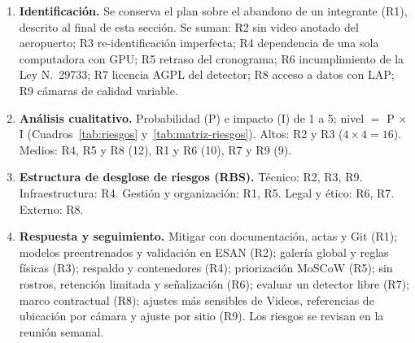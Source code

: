 \documentclass[12pt,a4paper]{article}
\begin{document}
\begin{enumerate}
    \item \textbf{Identificación.} Se conserva el plan sobre el abandono de un
    integrante (R1), descrito al final de esta sección. Se suman: R2 sin video
    anotado del aeropuerto; R3 re-identificación imperfecta; R4 dependencia de
    una sola computadora con GPU; R5 retraso del cronograma; R6
    incumplimiento de la Ley N.\textdegree~29733; R7 licencia AGPL del
    detector; R8 acceso a datos con LAP; R9 cámaras de calidad variable.

    \item \textbf{Análisis cualitativo.} Probabilidad (P) e impacto (I) de 1 a
    5; nivel $=$ P $\times$ I (Cuadros~\ref{tab:riesgos} y~\ref{tab:matriz-riesgos}).
    Altos: R2 y R3 ($4 \times 4 = 16$). Medios: R4, R5 y R8 (12), R1 y R6
    (10), R7 y R9 (9).

    \item \textbf{Estructura de desglose de riesgos (RBS).} Técnico: R2, R3, R9.
    Infraestructura: R4. Gestión y organización: R1, R5. Legal y ético: R6, R7. Externo: R8.

    \item \textbf{Respuesta y seguimiento.} Mitigar con documentación, actas y
    Git (R1); modelos preentrenados y validación en ESAN (R2); galería global
    y reglas físicas (R3); respaldo y contenedores (R4); priorización MoSCoW
    (R5); sin rostros, retención limitada y señalización (R6); evaluar un
    detector libre (R7); marco contractual (R8); ajustes más sensibles de
    Videos, referencias de ubicación por cámara y ajuste por sitio (R9). Los
    riesgos se revisan en la
    reunión semanal.
\end{enumerate}
\end{document}
